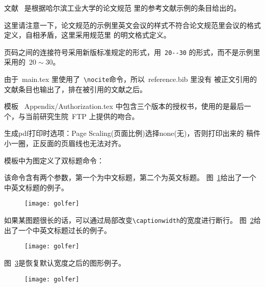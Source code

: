 文献~ \cite{Chen1992,Niwa1990,wu1997} 是根据哈尔滨工业大学的论文规范
里的参考文献示例的条目给出的。

这里请注意一下，论文规范的示例里英文会议的样式不符合论文规范里会议的格式定义，自相矛盾，这里采用规范里
的明文格式定义。

页码之间的连接符号采用新版标准规定的形式，用~\verb|20--30| 的形式，而不是示例里采用的~$20\sim 30$。

由于~main.tex 里使用了~\verb|\nocite|命令，所以~reference.bib 里没有
被正文引用的文献条目也输出了，排在被引用的文献之后。

模板 ~Appendix/Authorization.tex 中包含三个版本的授权书，使用的是最后一个，与当前研究生院~FTP 上提供的吻合。

\label{Tricks:Print}
生成pdf打印时选项：Page Scaling(页面比例)选择none(无)，否则打印出来的
稿件小一圈，正反面的页眉线也无法对齐。

\label{Tricks:Captions}
模板中为图定义了双标题命令：
\begin{verb}
\end{verb}
该命令含有两个参数，第一个为中文标题，第二个为英文标题。
图~\ref{Figure:Tricks:Example1}给出了一个中英文标题的例子。

\begin{figure}[htbp]
\centering
\texttt{[image: golfer]}
\label{Figure:Tricks:Example1}
\end{figure}

如果某图题很长的话，可以通过局部改变\verb|\captionwidth|的宽度进行断行。
图~\ref{Figure:Tricks:Example11}给出了一个中英文标题过长的例子。

\begin{figure}[htbp]
\centering
\texttt{[image: golfer]}
\changecaptionwidth {}
 \label{Figure:Tricks:Example11}
\end{figure}

\normalcaptionwidth
图~\ref{Figure:Tricks:Example12}是恢复默认宽度之后的图形例子。
\begin{figure}[htbp]
\centering
\texttt{[image: golfer]}
\label{Figure:Tricks:Example12}
\end{figure}


